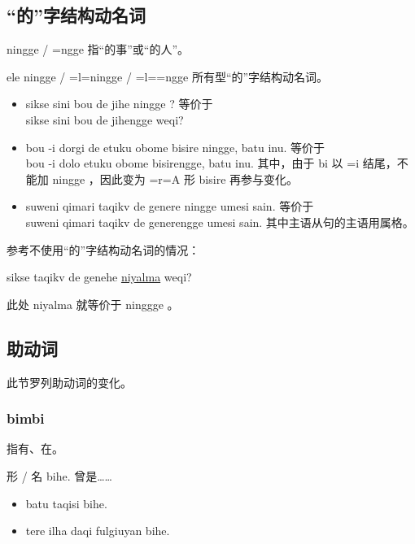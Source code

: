 \subsection{“的”字结构动名词}

\begin{des}
    \item[\V\ftn{形} ningge / \V\ftn{形}\!=ngge ] 指“\V 的事”或“\V 的人”。
    \item[\V\ftn{形} ele ningge / \V\ftn{形}=l=\AIfina ningge / \V\ftn{形}=l=\AImedi=ngge] 所有型“的”字结构动名词。
\end{des}

\begin{itemize}
    \item sikse sini bou de jihe ningge ? 等价于\\
          sikse sini bou de jihengge weqi?
    \item bou -i dorgi de etuku obome bisire ningge, batu inu. 等价于\\
          bou -i dolo etuku obome bisirengge, batu inu. 其中，由于 bi 以 =i 结尾，不能加 ningge ，因此变为 =r=A 形 bisire 再参与变化。
    \item suweni qimari taqikv de genere ningge umesi sain. 等价于\\
          suweni qimari taqikv de generengge umesi sain. 其中主语从句的主语用属格。
\end{itemize}

参考不使用“的”字结构动名词的情况：

sikse taqikv de genehe \underline{niyalma} weqi?

此处 niyalma 就等价于 ninggge 。

\subsection{助动词}

此节罗列助动词的变化。

\subsubsection{bimbi}

指有、在。

\begin{des}
    \item[形 / 名 bihe.] 曾是……
        \begin{itemize}
            \item batu  taqisi bihe.
            \item tere ilha daqi fulgiuyan bihe.
        \end{itemize}
\end{des}

